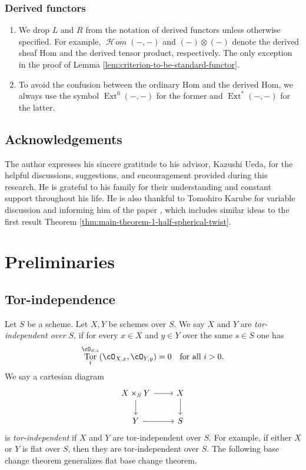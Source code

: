 \documentclass{amsart}
\numberwithin{equation}{section}
\theoremstyle{plain}
\theoremstyle{definition}
\DeclareMathOperator{\Tor}{\mathrm{Tor}}
\DeclareMathOperator{\CHom}{\mathcal{H}\!\mathit{om}}
\DeclareMathOperator{\Ext}{\mathrm{Ext}}
\begin{document}
\subsubsection*{Derived functors}
\begin{enumerate}
    \item We drop $L$ and $R$ from the notation of derived functors unless otherwise specified. For example, $\CHom(-, -)$ and $(-)\otimes (-)$ denote the derived sheaf Hom and the derived tensor product, respectively. The only exception in the proof of Lemma \ref{lem:criterion-to-be-standard-functor}.
    \item To avoid the confusion between the ordinary Hom and the derived Hom, we always use the symbol $\Ext^0(-, -)$ for the former and $\Ext^*(-, -)$ for the latter.
\end{enumerate}


\subsection*{Acknowledgements}
The author expresses his sincere gratitude to his advisor, Kazushi Ueda, for the helpful discussions, suggestions, and encouragement provided during this research.
He is grateful to his family for their understanding and constant support throughout his life.
He is also thankful to Tomohiro Karube for variable discussion and informing him of the paper \cite{2023arXiv230109453K}, which includes similar ideas to the first result Theorem \ref{thm:main-theorem-1-half-spherical-twist}.




\section{Preliminaries}\label{section:preliminaries}
\subsection{Tor-independence}
Let $S$ be a scheme.
Let $X, Y$ be schemes over $S$.
We say $X$ and $Y$ are \emph{tor-independent over $S$}, if for every $x \in X$ and $y \in Y$ over the same $s \in S$ one has
\begin{equation}
    \Tor_i^{\cO_{S, s}}(\cO_{X, x}, \cO_{Y, y}) = 0 \quad \text{for all } i > 0.
\end{equation}
We say a cartesian diagram
\[
    \begin{tikzcd}
        X \times_S Y \ar[r] \ar[d] & X \ar[d]\\
        Y \ar[r] & S
    \end{tikzcd}
\]
is \emph{tor-independent} if $X$ and $Y$ are tor-independent over $S$.
For example, if either $X$ or $Y$ is flat over $S$, then they are tor-independent over $S$.
The following base change theorem generalizes flat base change theorem.
\end{document}
